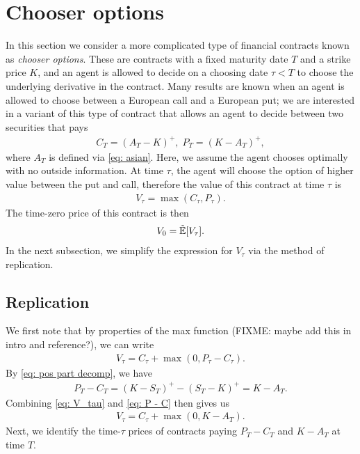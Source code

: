 \documentclass[reqno]{amsart}
\begin{document}
\section{Chooser options}
In this section we consider a more complicated type of financial contracts known as \emph{chooser options}. These are contracts with a fixed maturity date $T$ and a strike price $K$, and an agent is allowed to decide on a choosing date $\tau < T$ to choose the underlying derivative in the contract. Many results are known when an agent is allowed to choose between a European call and a European put; we are interested in a variant of this type of contract that allows an agent to decide between two securities that pays 
\begin{align}
     C_T = (A_T - K)^+, \; P_T = (K - A_T)^+,
\end{align}
where $A_T$ is defined via \eqref{eq: asian}.
Here, we assume the agent chooses optimally with no outside information. At time $\tau$, the agent will choose the option of higher value between the put and call, therefore the value of this contract at time $\tau$ is 
\begin{align}\label{eq: V_tau}
     V_\tau = \max(C_\tau, P_\tau).
\end{align}
The time-zero price of this contract is then 
\begin{align}
      V_0 = \tilde{\mathbb{E}}[V_\tau].
\end{align}
In the next subsection, we simplify the expression for $V_\tau$ via the method of replication. 
\subsection{Replication}
We first note that by properties of the max function (FIXME: maybe add this in intro and reference?), we can write 
\begin{align}\label{eq: chooser formula PC}
     V_\tau = C_\tau + \max(0, P_\tau - C_\tau).
\end{align}
By \eqref{eq: pos part decomp}, we have
\begin{align}\label{eq: P - C}
     P_T - C_T = (K-S_T)^+ - (S_T - K)^+ = K - A_T. 
\end{align}
Combining \eqref{eq: V_tau} and \eqref{eq: P - C} then gives us 
\begin{align}
      V_\tau = C_\tau + \max(0, K - A_T).
\end{align}
Next, we identify the time-$\tau$ prices of contracts paying $P_T - C_T$ and $K - A_T$ at time $T$.
\end{document}
